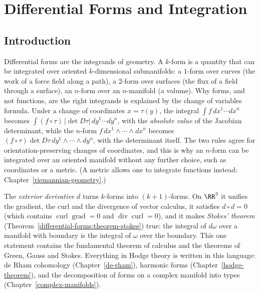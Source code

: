 \chapter{Differential Forms and Integration}\label{differential-forms}

\section{Introduction}\label{differential-forms:section-introduction}

Differential forms are the integrands of geometry. A $k$-form is a quantity that can be integrated over oriented $k$-dimensional submanifolds: a $1$-form over curves (the
work of a force field along a path), a $2$-form over surfaces (the flux of a field through a surface), an $n$-form over an $n$-manifold (a volume). Why forms, and not functions,
are the right integrands is explained by the change of variables formula. Under a change of coordinates $x = \tau(y)$, the integral $\int f\,dx^1 \cdots dx^n$ becomes
$\int(f \circ \tau)\,|\det D\tau|\,dy^1 \cdots dy^n$, with the \emph{absolute value} of the Jacobian determinant, while the $n$-form $f\,dx^1 \wedge \cdots \wedge dx^n$ becomes
$(f \circ \tau)\det D\tau\,dy^1 \wedge \cdots \wedge dy^n$, with the determinant itself. The two rules agree for orientation-preserving changes of coordinates, and this is why an
$n$-form can be integrated over an oriented manifold without any further choice, such as coordinates or a metric. (A metric allows one to integrate functions instead:
Chapter~\ref{riemannian-geometry}.)

The \emph{exterior derivative} $d$ turns $k$-forms into $(k + 1)$-forms. On $\RR^3$ it unifies the gradient, the curl and the divergence of vector calculus, it satisfies
$d \circ d = 0$ (which contains $\operatorname{curl}\operatorname{grad} = 0$ and $\operatorname{div}\operatorname{curl} = 0$), and it makes \emph{Stokes' theorem}
(Theorem~\ref{differential-forms:theorem-stokes}) true: the integral of $d\omega$ over a manifold with boundary is the integral of $\omega$ over the boundary. This one statement
contains the fundamental theorem of calculus and the theorems of Green, Gauss and Stokes. Everything in Hodge theory is written in this language: de Rham cohomology
(Chapter~\ref{de-rham}), harmonic forms (Chapter~\ref{hodge-theorem}), and the decomposition of forms on a complex manifold into types (Chapter~\ref{complex-manifolds}).

